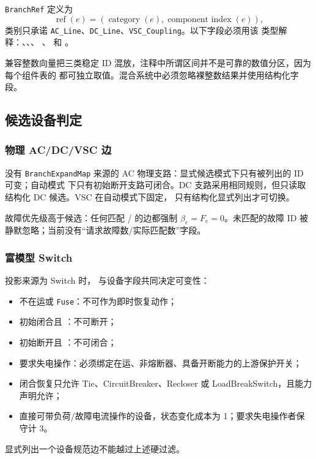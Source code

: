 \texttt{BranchRef} 定义为
\begin{equation}
\operatorname{ref}(e)=(\operatorname{category}(e),\operatorname{component\ index}(e)),
\end{equation}
类别只承诺 \texttt{AC\_Line}、\texttt{DC\_Line}、\texttt{VSC\_Coupling}。以下字段必须用该
类型解释：、、、
、 和 。

兼容整数向量把三类稳定 ID 混放，注释中所谓区间并不是可靠的数值分区，因为每个组件表的
 都可独立取值。混合系统中必须忽略裸整数结果并使用结构化字段。

\subsection{候选设备判定}

\subsubsection{物理 AC/DC/VSC 边}

没有 \texttt{BranchExpandMap} 来源的 AC 物理支路：显式候选模式下只有被列出的 ID 可变；自动模式
下只有初始断开支路可闭合。DC 支路采用相同规则，但只读取结构化 DC 候选。VSC 在自动模式下固定，
只有结构化显式列出才可切换。

故障优先级高于候选：任何匹配 / 的边都强制
$\beta_e=F_e=0$。未匹配的故障 ID 被静默忽略；当前没有“请求故障数/实际匹配数”字段。

\subsubsection{富模型 Switch}

投影来源为 Switch 时， 与设备字段共同决定可变性：
\begin{itemize}
  \item 不在运或 \texttt{Fuse}：不可作为即时恢复动作；
  \item 初始闭合且 ：不可断开；
  \item 初始断开且 ：不可闭合；
  \item 要求失电操作：必须绑定在运、非熔断器、具备开断能力的上游保护开关；
  \item 闭合恢复只允许 Tie、CircuitBreaker、Recloser 或 LoadBreakSwitch，且能力声明允许；
  \item 直接可带负荷/故障电流操作的设备，状态变化成本为 1；要求失电操作者保守计 3。
\end{itemize}
显式列出一个设备规范边不能越过上述硬过滤。


